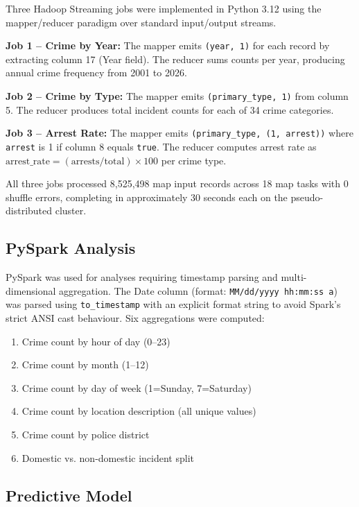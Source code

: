 \documentclass[conference]{IEEEtran}
\begin{document}
Three Hadoop Streaming jobs were implemented in Python 3.12 using the
mapper/reducer paradigm over standard input/output streams.

\textbf{Job 1 -- Crime by Year:} The mapper emits \texttt{(year, 1)} for each
record by extracting column 17 (Year field). The reducer sums counts per year,
producing annual crime frequency from 2001 to 2026.

\textbf{Job 2 -- Crime by Type:} The mapper emits \texttt{(primary\_type, 1)}
from column 5. The reducer produces total incident counts for each of 34 crime
categories.

\textbf{Job 3 -- Arrest Rate:} The mapper emits \texttt{(primary\_type, (1, arrest))}
where \texttt{arrest} is 1 if column 8 equals \texttt{true}. The reducer
computes arrest rate as $\text{arrest\_rate} = (\text{arrests} / \text{total}) \times 100$
per crime type.

All three jobs processed 8,525,498 map input records across 18 map tasks with
0 shuffle errors, completing in approximately 30 seconds each on the
pseudo-distributed cluster.

\subsection{PySpark Analysis}

PySpark was used for analyses requiring timestamp parsing and multi-dimensional
aggregation. The Date column (format: \texttt{MM/dd/yyyy hh:mm:ss a}) was parsed
using \texttt{to\_timestamp} with an explicit format string to avoid Spark's strict
ANSI cast behaviour. Six aggregations were computed:

\begin{enumerate}
    \item Crime count by hour of day (0--23)
    \item Crime count by month (1--12)
    \item Crime count by day of week (1=Sunday, 7=Saturday)
    \item Crime count by location description (all unique values)
    \item Crime count by police district
    \item Domestic vs. non-domestic incident split
\end{enumerate}

\subsection{Predictive Model}
\end{document}
